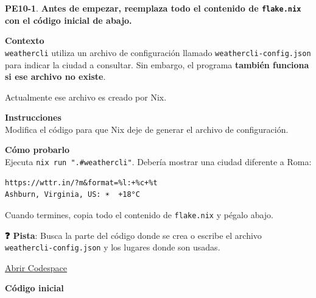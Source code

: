 \textbf{PE10-1}. \textbf{Antes de empezar, reemplaza todo el contenido de \texttt{flake.nix} con el código inicial de abajo.}

\textbf{Contexto}\\
\texttt{weathercli} utiliza un archivo de configuración llamado \texttt{weathercli-\allowbreak{}config.\allowbreak{}json} para indicar la ciudad a consultar. Sin embargo, el programa \textbf{también funciona si ese archivo no existe}.

Actualmente ese archivo es creado por Nix.

\textbf{Instrucciones}\\
Modifica el código para que Nix deje de generar el archivo de configuración.

\textbf{Cómo probarlo}\\
Ejecuta \texttt{nix run ".\allowbreak{}\#weathercli"}. Debería mostrar una ciudad diferente a Roma:

\begin{bloquecodigo}
\begin{lstlisting}
https://wttr.in/?m&format=%l:+%c+%t
Ashburn, Virginia, US: ☀️  +18°C
\end{lstlisting}
\end{bloquecodigo}

Cuando termines, copia todo el contenido de \texttt{flake.nix} y pégalo abajo.

\textbf{❓ Pista}: Busca la parte del código donde se crea o escribe el archivo \texttt{weathercli-\allowbreak{}config.\allowbreak{}json} y los lugares donde son usadas.

\href{https://codespaces.new/DanielRasho/Thesis-codespaces?quickstart=1&devcontainer_path=.devcontainer/nix/devcontainer.json}{\underline{Abrir Codespace}}

\textbf{Código inicial}

